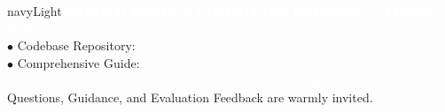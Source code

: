 \documentclass[aspectratio=169,10pt]{beamer}
\begin{document}
{\begin{frame}[plain]
  \vspace{0.6cm}
  \begin{beamercolorbox}[wd=\textwidth,rounded=true]{navyLight}
    \scriptsize \textbf{\textcolor{white}{ZEROTH REVIEW COMMITTEE DEFENSE --- THANK YOU}}\\[0.1cm]
    \tiny \textcolor{blueAccent}{$\bullet$ Codebase Repository:} \textcolor{white}{https://github.com/ramKarthik57/containerguard}\\[0.05cm]
    \tiny \textcolor{blueAccent}{$\bullet$ Comprehensive Guide:} \textcolor{white}{docs/ContainerGuard\_Comprehensive\_Project\_Guide.pdf}\\[0.05cm]
    \tiny \textcolor{gray!30}{Questions, Guidance, and Evaluation Feedback are warmly invited.}
  \end{beamercolorbox}
\end{frame}
}
\end{document}
